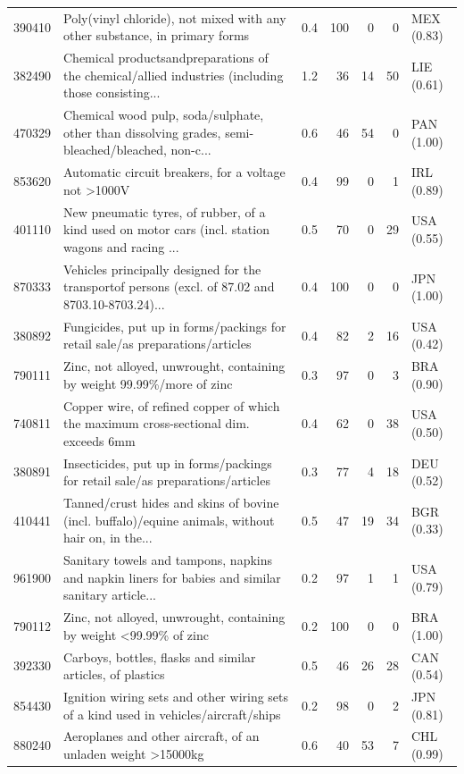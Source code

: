 \begin{tabular}{@{}l p{6.4cm} r r r r l@{}}
390410 & Poly(vinyl chloride), not mixed with any other substance, in primary forms & 0.4 & 100 & 0 & 0 & MEX (0.83) \\
382490 & Chemical productsandpreparations of the chemical/\allowbreak{}allied industries (including those consisting... & 1.2 & 36 & 14 & 50 & LIE (0.61) \\
470329 & Chemical wood pulp, soda/\allowbreak{}sulphate, other than dissolving grades, semi-bleached/\allowbreak{}bleached, non-c... & 0.6 & 46 & 54 & 0 & PAN (1.00) \\
853620 & Automatic circuit breakers, for a voltage not >1000V & 0.4 & 99 & 0 & 1 & IRL (0.89) \\
401110 & New pneumatic tyres, of rubber, of a kind used on motor cars (incl. station wagons and racing ... & 0.5 & 70 & 0 & 29 & USA (0.55) \\
870333 & Vehicles principally designed for the transportof persons (excl. of 87.02 and 8703.10-8703.24)... & 0.4 & 100 & 0 & 0 & JPN (1.00) \\
380892 & Fungicides, put up in forms/\allowbreak{}packings for retail sale/\allowbreak{}as preparations/\allowbreak{}articles  & 0.4 & 82 & 2 & 16 & USA (0.42) \\
790111 & Zinc, not alloyed, unwrought, containing by weight 99.99\%/\allowbreak{}more of zinc & 0.3 & 97 & 0 & 3 & BRA (0.90) \\
740811 & Copper wire, of refined copper of which the maximum cross-sectional dim. exceeds 6mm & 0.4 & 62 & 0 & 38 & USA (0.50) \\
380891 & Insecticides, put up in forms/\allowbreak{}packings for retail sale/\allowbreak{}as preparations/\allowbreak{}articles  & 0.3 & 77 & 4 & 18 & DEU (0.52) \\
410441 & Tanned/\allowbreak{}crust hides and skins of bovine (incl. buffalo)/\allowbreak{}equine animals, without hair on, in the... & 0.5 & 47 & 19 & 34 & BGR (0.33) \\
961900 & Sanitary towels and tampons, napkins and napkin liners for babies and similar sanitary article... & 0.2 & 97 & 1 & 1 & USA (0.79) \\
790112 & Zinc, not alloyed, unwrought, containing by weight <99.99\% of zinc & 0.2 & 100 & 0 & 0 & BRA (1.00) \\
392330 & Carboys, bottles, flasks and similar articles, of plastics & 0.5 & 46 & 26 & 28 & CAN (0.54) \\
854430 & Ignition wiring sets and other wiring sets of a kind used in vehicles/\allowbreak{}aircraft/\allowbreak{}ships & 0.2 & 98 & 0 & 2 & JPN (0.81) \\
880240 & Aeroplanes and other aircraft, of an unladen weight >15000kg & 0.6 & 40 & 53 & 7 & CHL (0.99) \\
\bottomrule
\end{tabular}
